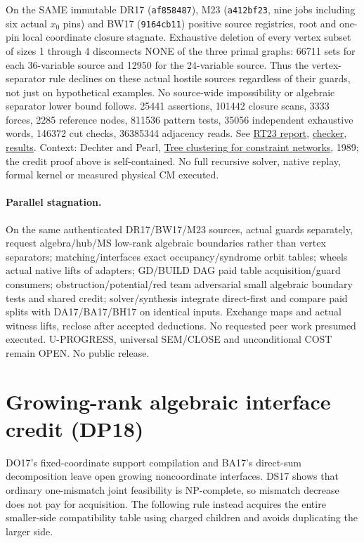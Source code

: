 \documentclass[11pt]{article}
\begin{document}
On the SAME immutable DR17 (\texttt{af858487}), M23 (\texttt{a412bf23}, nine jobs including six actual $x_0$ pins) and BW17 (\texttt{9164cb11}) positive source registries, root and one-pin local coordinate closure stagnate. Exhaustive deletion of every vertex subset of sizes 1 through 4 disconnects NONE of the three primal graphs: 66711 sets for each 36-variable source and 12950 for the 24-variable source. Thus the vertex-separator rule declines on these actual hostile sources regardless of their guards, not just on hypothetical examples. No source-wide impossibility or algebraic separator lower bound follows. 25441 assertions, 101442 closure scans, 3333 forces, 2285 reference nodes, 811536 pattern tests, 35056 independent exhaustive words, 146372 cut checks, 36385344 adjacency reads. See \href{https://github.com/j15marti/pnp/commit/959f813b4043317cd46176a3d48d9212382a53b9}{RT23 report}, \href{https://github.com/j15marti/pnp/commit/91aa857b46d424f829d9a13fcb17cc90cdd9a3c1}{checker}, \href{https://github.com/j15marti/pnp/commit/17335743f13d168a9e8858dba2209cff5e937a1e}{results}. Context: Dechter and Pearl, \href{https://doi.org/10.1016/0004-3702(89)90037-4}{Tree clustering for constraint networks}, 1989; the credit proof above is self-contained. No full recursive solver, native replay, formal kernel or measured physical CM executed.

\paragraph{Parallel stagnation.}
On the same authenticated DR17/BW17/M23 sources, actual guards separately, request algebra/hub/MS low-rank algebraic boundaries rather than vertex separators; matching/interfaces exact occupancy/syndrome orbit tables; wheels actual native lifts of adapters; GD/BUILD DAG paid table acquisition/guard consumers; obstruction/potential/red team adversarial small algebraic boundary tests and shared credit; solver/synthesis integrate direct-first and compare paid splits with DA17/BA17/BH17 on identical inputs. Exchange maps and actual witness lifts, reclose after accepted deductions. No requested peer work presumed executed. U-PROGRESS, universal SEM/CLOSE and unconditional COST remain OPEN. No public release.


\section{Growing-rank algebraic interface credit (DP18)}\label{sec:dp18}
DO17's fixed-coordinate support compilation and BA17's direct-sum decomposition leave open growing noncoordinate interfaces. DS17 shows that ordinary one-mismatch joint feasibility is NP-complete, so mismatch decrease does not pay for acquisition. The following rule instead acquires the entire smaller-side compatibility table using charged children and avoids duplicating the larger side.
\end{document}
